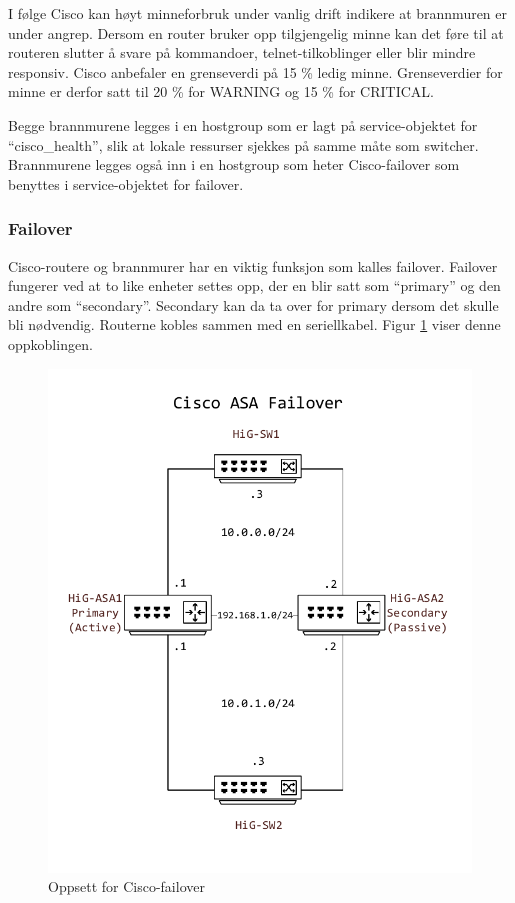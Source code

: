 I følge Cisco kan høyt minneforbruk under vanlig drift indikere at brannmuren er under angrep\cite{ciscomem}. Dersom en router bruker opp tilgjengelig minne kan det føre til at routeren slutter å svare på kommandoer, telnet-tilkoblinger eller blir mindre responsiv\cite{ciscomemproblem}. Cisco anbefaler en grenseverdi på 15 \% ledig minne\cite{ciscounifiedcommunication}. Grenseverdier for minne er derfor satt til 20 \% for WARNING og 15 \% for CRITICAL.

Begge brannmurene legges i en hostgroup som er lagt på service-objektet for ``cisco\_health'', slik at lokale ressurser sjekkes på samme måte som switcher. Brannmurene legges også inn i en hostgroup som heter Cisco-failover som benyttes i service-objektet for failover.

\clearpage
\subsubsection{Failover}
Cisco-routere og brannmurer har en viktig funksjon som kalles failover. Failover fungerer ved at to like enheter settes opp, der en blir satt som ``primary'' og den andre som ``secondary''. Secondary kan da ta over for primary dersom det skulle bli nødvendig. Routerne kobles sammen med en seriellkabel. Figur \ref{ciscoasafailover} viser denne oppkoblingen. 

\begin{figure}[H]
    \centering
    \includegraphics[scale=0.6]{img/asafailover}
    \caption{Oppsett for Cisco-failover}
    \label{ciscoasafailover}
\end{figure}

